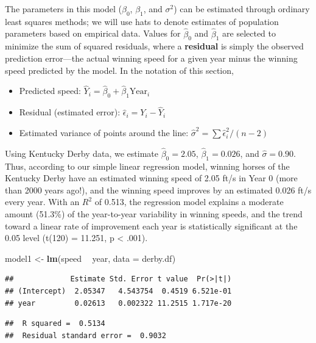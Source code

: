 \documentclass[
]{krantz}
\newenvironment{Shaded}{\begin{snugshade}}{\end{snugshade}}
\newcommand{\DataTypeTok}[1]{\textcolor[rgb]{0.27,0.27,0.27}{#1}}
\newcommand{\KeywordTok}[1]{\textcolor[rgb]{0.27,0.27,0.27}{\textbf{#1}}}
\newcommand{\NormalTok}[1]{#1}
\newcommand{\OperatorTok}[1]{\textcolor[rgb]{0.43,0.43,0.43}{\textbf{#1}}}
\newcommand{\StringTok}[1]{\textcolor[rgb]{0.5,0.5,0.5}{#1}}
\providecommand{\tightlist}{%
  \setlength{\itemsep}{0pt}\setlength{\parskip}{0pt}}
\begin{document}
The parameters in this model (\(\beta_{0}\), \(\beta_{1}\), and \(\sigma^2\)) can be estimated through ordinary least squares methods; we will use hats to denote estimates of population parameters based on empirical data. Values for \(\hat{\beta}_{0}\) and \(\hat{\beta}_{1}\) are selected to minimize the sum of squared residuals, where a \textbf{residual}  is simply the observed prediction error---the actual winning speed for a given year minus the winning speed predicted by the model. In the notation of this section,

\begin{itemize}
\tightlist
\item
  Predicted speed: \(\hat{Y}_{i}=\hat{\beta}_{0}+\hat{\beta}_{1}\textrm{Year}_{i}\)
\item
  Residual (estimated error): \(\hat{\epsilon}_{i}=Y_{i} - \hat{Y}_{i}\)
\item
  Estimated variance of points around the line: \(\hat{\sigma}^2 = \sum \hat{\epsilon}^2_{i} / (n-2)\)
\end{itemize}

Using Kentucky Derby data, we estimate \(\hat{\beta}_{0}=2.05\), \(\hat{\beta}_{1}=0.026\), and \(\hat{\sigma}=0.90\). Thus, according to our simple linear regression model, winning horses of the Kentucky Derby have an estimated winning speed of 2.05 ft/s in Year 0 (more than 2000 years ago!), and the winning speed improves by an estimated 0.026 ft/s every year. With an \(R^2\) of 0.513, the regression model explains a moderate amount (51.3\%) of the year-to-year variability in winning speeds, and the trend toward a linear rate of improvement each year is statistically significant at the 0.05 level (t(120) = 11.251, p \textless{} .001).

\begin{Shaded}
\begin{Highlighting}[]
\NormalTok{model1 <-}\StringTok{ }\KeywordTok{lm}\NormalTok{(speed }\OperatorTok{~}\StringTok{ }\NormalTok{year, }\DataTypeTok{data =}\NormalTok{ derby.df)}
\end{Highlighting}
\end{Shaded}

\begin{verbatim}
##             Estimate Std. Error t value  Pr(>|t|)
## (Intercept)  2.05347   4.543754  0.4519 6.521e-01
## year         0.02613   0.002322 11.2515 1.717e-20
\end{verbatim}

\begin{verbatim}
##  R squared =  0.5134 
##  Residual standard error =  0.9032
\end{verbatim}
\end{document}
